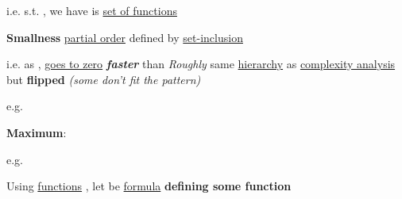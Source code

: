 \begin{itemize}
      \vItem
            i.e.  s.t. \iMbox{\forall \epsilon}, we have
      \vItem
             is \ul{set of functions}
\end{itemize}

\hSep %

\textbf{Smallness} \ul{partial order} 
defined by \ul{set-inclusion} 

\begin{itemize}

      \vItem
            i.e. as ,  \ul{goes to zero}
            \textbf{\emph{faster}} than 
      \vItem
            \emph{Roughly} same \ul{hierarchy} as \ul{complexity analysis} but
            \textbf{flipped} \emph{(some don't fit the pattern)}

            \begin{itemize}
                  \vItem e.g. 
            \end{itemize}
      \vItem
            \textbf{Maximum}:

            \begin{itemize}
                  \vItem e.g. 
            \end{itemize}
\end{itemize}

\hSep %

Using \ul{functions} , let 
be \ul{formula} \textbf{defining some function}

